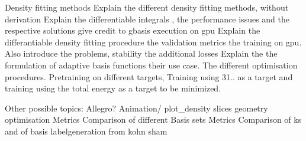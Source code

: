 Density fitting methods 
Explain the different density fitting methods, without derivation
Explain the differentiable integrals , the performance issues and the respective solutions give credit to gbasis execution on gpu
Explain the differantiable density fitting procedure the validation metrics the training on gpu.
Also introduce the problems, stability the additional losses
Explain the the formulation of adaptive basis functions their use case. The different optimisation procedures. Pretraining on different targets, Training using 31.. as a target and training using the total energy as a target to be minimized.




Other possible topics:
Allegro?
Animation/ plot_density slices
geometry optimisation
Metrics
Comparison of different Basis sets Metrics 
Comparison of ks and of basis
labelgeneration  from kohn sham
